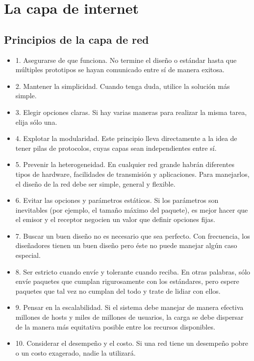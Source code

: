 \section{La capa de internet}

	\subsection{Principios de la capa de red}
	\begin{itemize}
		\item 1. Asegurarse de que funciona. No termine el diseño o estándar hasta que múltiples prototipos se hayan comunicado entre sí de manera exitosa.
 		\item 2. Mantener la simplicidad. Cuando tenga duda, utilice la solución más simple.
 		\item 3. Elegir opciones claras. Si hay varias maneras para realizar la misma tarea, elija sólo una.
  		\item 4. Explotar la modularidad. Este principio lleva directamente a la idea de tener pilas de protocolos, cuyas capas sean independientes entre sí.
		\item 5. Prevenir la heterogeneidad. En cualquier red grande habrán diferentes tipos de hardware, facilidades de transmisión y aplicaciones. Para manejarlos, el diseño de la red debe ser simple, general y flexible.
		\item 6. Evitar las opciones y parámetros estáticos. Si los parámetros son inevitables (por ejemplo, el tamaño máximo del paquete), es mejor hacer que el emisor y el receptor negocien un valor que definir opciones fijas.
		\item 7. Buscar un buen diseño no es necesario que sea perfecto. Con frecuencia, los diseñadores tienen
un buen diseño pero éste no puede manejar algún caso especial.
		\item 8. Ser estricto cuando envíe y tolerante cuando reciba. En otras palabras, sólo envíe paquetes que
cumplan rigurosamente con los estándares, pero espere paquetes que tal vez no cumplan del todo
y trate de lidiar con ellos.
		\item 9. Pensar en la escalabilidad. Si el sistema debe manejar de manera efectiva millones de hosts y
miles de millones de usuarios, la carga se debe dispersar de la manera más equitativa posible entre los recursos disponibles.
		\item 10. Considerar el desempeño y el costo. Si una red tiene un desempeño pobre o un costo exagerado,
nadie la utilizará.
	\end{itemize}

